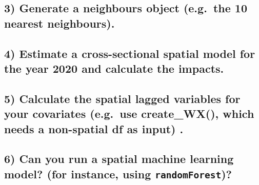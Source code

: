 \documentclass[
  letterpaper,
]{scrbook}
\begin{document}
\hypertarget{generate-a-neighbours-object-e.g.-the-10-nearest-neighbours.}{%
\subsection*{3) Generate a neighbours object (e.g.~the 10 nearest
neighbours).}\label{generate-a-neighbours-object-e.g.-the-10-nearest-neighbours.}}

\hypertarget{estimate-a-cross-sectional-spatial-model-for-the-year-2020-and-calculate-the-impacts.}{%
\subsection*{4) Estimate a cross-sectional spatial model for the year
2020 and calculate the
impacts.}\label{estimate-a-cross-sectional-spatial-model-for-the-year-2020-and-calculate-the-impacts.}}

\hypertarget{calculate-the-spatial-lagged-variables-for-your-covariates-e.g.-use-create_wx-which-needs-a-non-spatial-df-as-input-.}{%
\subsection*{5) Calculate the spatial lagged variables for your
covariates (e.g.~use create\_WX(), which needs a non-spatial df as
input)
.}\label{calculate-the-spatial-lagged-variables-for-your-covariates-e.g.-use-create_wx-which-needs-a-non-spatial-df-as-input-.}}

\hypertarget{can-you-run-a-spatial-machine-learning-model-for-instance-using-randomforest}{%
\subsection*{\texorpdfstring{6) Can you run a spatial machine learning
model? (for instance, using
\texttt{randomForest})?}{6) Can you run a spatial machine learning model? (for instance, using randomForest)?}}\label{can-you-run-a-spatial-machine-learning-model-for-instance-using-randomforest}}
\end{document}
